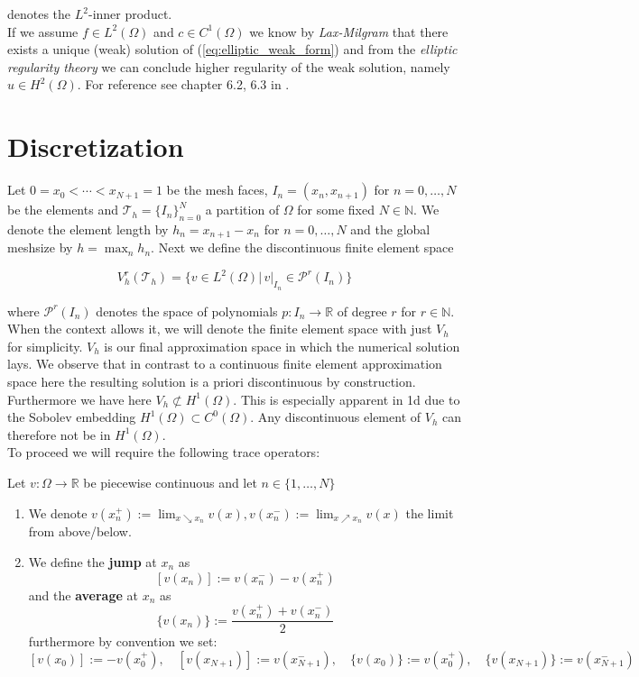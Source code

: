 denotes the $L^2$-inner product. \\
If we assume $f \in L^2(\Omega)$ and $c \in C^1(\Omega)$ we know by \textit{Lax-Milgram} 
that there exists a unique (weak) solution of (\ref{eq:elliptic_weak_form}) and from the \textit{elliptic regularity theory} we 
can conclude higher regularity of the weak solution, namely $u \in H^2(\Omega)$. For reference see chapter 6.2, 6.3 in \cite{EvansPDE}.

\section{Discretization}
Let $0=x_0 < \cdots < x_{N+1} = 1$ be the mesh faces, $I_n = (x_n, x_{n+1})$ for $n = 0,\ldots,N$ be the elements and $\mathcal{T}_h = \{I_n\}_{n=0}^N$ a partition
of $\Omega$ for some fixed $N\in \mathbb{N}$.
We denote the element length by $h_n = x_{n+1} - x_{n}$ for $n=0,\ldots,N$ and the global meshsize by
$h = \max_{n} h_n$.
Next we define the discontinuous finite element space
\begin{tcolorbox}[mythmstyle, colback=green!10!white]
	\begin{equation}
		V_h^r(\mathcal{T}_h) = \{v \in L^2(\Omega) |\, v|_{I_n} \in \mathcal{P}^r(I_n) \}
	\end{equation}
\end{tcolorbox}
where $\mathcal{P}^r(I_n)$ denotes the space of polynomials $p:I_n \to \mathbb{R}$ of degree $r$
for $r \in \mathbb{N}$. When the context allows it, we will denote the
finite element space with just $V_h$ for simplicity.
$V_h$ is our final approximation space in which the numerical solution
lays.
We observe that in contrast to a continuous finite element approximation space
here the resulting solution is a priori discontinuous by construction.
Furthermore we have here $V_h \not\subset H^1(\Omega)$.
This is especially apparent in 1d due to the Sobolev embedding $H^1(\Omega) \subset C^0(\Omega)$.
Any discontinuous element of $V_h$ can therefore not be in $H^1(\Omega)$. \\
To proceed we will require the following trace operators:

\begin{definition}
	\label{def:jump_average}
	Let $v:\Omega \to \mathbb{R}$ be piecewise continuous and let $n \in
		\{1,\ldots,N\}$
	\begin{enumerate}[label=\textnormal{(\roman*)}]
		\item We denote $v(x_n^+) := \lim_{x \searrow x_n} v(x), v(x_n^-) := \lim_{x \nearrow x_n} v(x)$
		      the limit from above/below.
		\item We define the \textbf{jump} at $x_n$ as
		      \[
			      [v(x_n)]:= v(x_n^-) - v(x_n^+)
		      \]
		      and the \textbf{average} at $x_n$ as
		      \[
			      \{v(x_n)\}:= \frac{v(x_n^+) + v(x_n^-)}{2}
		      \]
		      furthermore by convention we set:
		      \[
			      [v(x_0)] := -v(x_0^+),\quad [v(x_{N+1})] := v(x_{N+1}^-),\quad
			      \{v(x_0)\}:=v(x_0^+),\quad \{v(x_{N+1})\}:= v(x_{N+1}^-)
		      \]
	\end{enumerate}
\end{definition}

